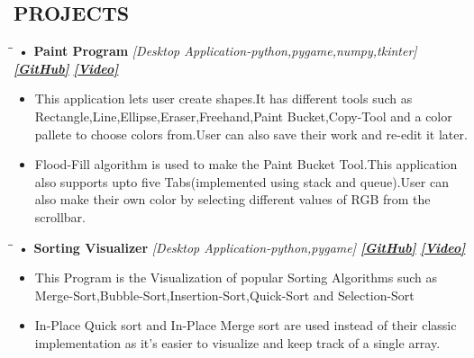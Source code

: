 \documentclass{res}[12pt]
\begin{document}
\begin{resume}
\section{\large{{PROJECTS}}}
   \vspace{-0.03in}	
   \begin{tabbing}
   \hspace{5.7in}\= \hspace{1in}\= \kill %
	   {\bf \large{• Paint Program}} \it{[Desktop Application-python,pygame,numpy,tkinter]}
	   \>\href{https://github.com/mukul1729/Paint}{\uline{\textbf{[GitHub]}}}
	   \>\href{https://vimeo.com/566776779}{\uline{\textbf{[Video]}}}
   \end{tabbing}\vspace{-8pt}      %
	\begin{itemize}
		\item This application lets user create shapes.It has different tools such as Rectangle,Line,Ellipse,Eraser,Freehand,Paint Bucket,Copy-Tool and a color pallete to choose colors from.User can
			also save their work and re-edit it later.
		\item Flood-Fill algorithm is used to make the Paint Bucket Tool.This application also supports upto five Tabs(implemented using stack and queue).User can also make their own color by selecting different values of RGB from the scrollbar.
	\end{itemize}
	\vspace{-0.2in}

   \begin{tabbing}
   \hspace{5.7in}\= \hspace{1in}\= \kill %
	   {\bf \large{• Sorting Visualizer}} \it{[Desktop Application-python,pygame]}
	   \>\href{https://github.com/mukul1729/Sorting-Visualizer}{\uline{\textbf{[GitHub]}}}
	   \>\href{https://vimeo.com/566772404}{\uline{\textbf{[Video]}}}
   \end{tabbing}\vspace{-8pt}      %
	\begin{itemize}
		\item This Program is the Visualization of popular Sorting Algorithms such as
			Merge-Sort,Bubble-Sort,Insertion-Sort,Quick-Sort and Selection-Sort
		\item In-Place Quick sort and In-Place Merge sort are used instead of their classic implementation as it's easier to visualize and keep track of a single array.


\end{itemize}
\end{resume}
\end{document}

